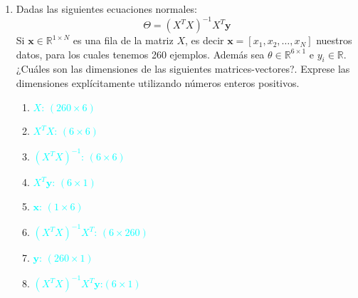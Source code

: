 \documentclass{exam}
\theoremstyle{definition}
\begin{document}
\begin{enumerate}
    \item Dadas las siguientes ecuaciones normales:
    \begin{equation}
      \Theta = (X^{T}X)^{-1}X^{T}\mathbf{y}
    \end{equation}
    Si $\mathbf{x} \in \mathbb{R}^{1\times N}$ es una fila de la matriz $X$, es decir $\mathbf{x}=[x_1,x_2,\dots,x_N]$ nuestros datos, para los cuales tenemos 260 ejemplos. Además sea $\theta\in \mathbb{R}^{6\times 1}$ e $y_i \in \mathbb{R}$. ¿Cuáles son las dimensiones de las siguientes matrices-vectores?. Exprese las dimensiones explícitamente utilizando números enteros positivos.
    \begin{enumerate}
        \item \textcolor{cyan}{$X$: $\left(260\times 6\right)$ }
        \item \textcolor{cyan}{$X^{T}X$: $\left(6\times 6\right)$ }
        \item\textcolor{cyan}{ $(X^{T}X)^{-1}$: $\left(6\times 6\right)$ }
        \item \textcolor{cyan}{$X^{T}\mathbf{y}$: $\left(6\times 1\right)$ }
        \item \textcolor{cyan}{$\mathbf{x}$: $\left(1\times 6\right)$ }
        \item \textcolor{cyan}{$(X^{T}X)^{-1}X^{T}$: $\left(6\times 260\right)$ }
        \item \textcolor{cyan}{$\mathbf{y}$: $\left(260\times 1\right)$ }
        \item \textcolor{cyan}{$(X^{T}X)^{-1}X^{T}\mathbf{y}$:$\left(6\times1\right)$}
    \end{enumerate}
\end{enumerate}
\end{document}
